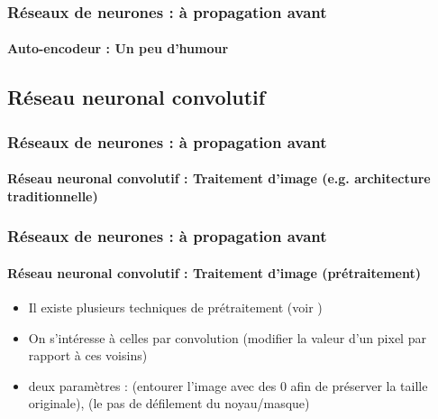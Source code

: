 \documentclass[xcolor=table]{beamer}
\begin{document}
\begin{frame}
\frametitle{Réseaux de neurones : à propagation avant}
\framesubtitle{Auto-encodeur : Un peu d'humour}

\begin{center}
\end{center}

\end{frame}

\subsection{Réseau neuronal convolutif}

\begin{frame}
\frametitle{Réseaux de neurones : à propagation avant}
\framesubtitle{Réseau neuronal convolutif : Traitement d'image (e.g. architecture traditionnelle)}

\begin{center}
\end{center}

\end{frame}

\begin{frame}
\frametitle{Réseaux de neurones : à propagation avant}
\framesubtitle{Réseau neuronal convolutif : Traitement d'image (prétraitement)}

\begin{itemize}
	\item Il existe plusieurs techniques de prétraitement (voir \cite{2010-alginahi})
	\item On s'intéresse à celles par convolution (modifier la valeur d'un pixel par rapport à ces voisins)
	\item deux paramètres :  (entourer l'image avec des 0 afin de préserver la taille originale),  (le pas de défilement du noyau/masque)
\end{itemize}

\begin{center}
\end{center}

\end{frame}
\end{document}
